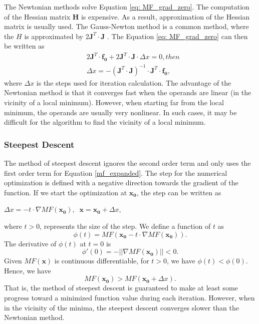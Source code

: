 The Newtonian methods solve Equation \ref{eq: MF_grad_zero}. The computation of the Hessian matrix $\pmb{H}$ is expensive. As a result, approximation of the Hessian matrix is usually used. The Gauss-Newton method is a common method, where the $H$ is approximated by $2\pmb{J}^T \cdot \pmb{J}$ . The Equation \ref{eq: MF_grad_zero} can then be written as 
\begin{equation} \label{eq: gauss-newton}
\begin{split}
&2 \pmb{J}^{T} \cdot \pmb{f_0} + 2\pmb{J}^T \cdot \pmb{J} \cdot \Delta x = 0 ,  then\\
&\Delta x = - (\pmb{J}^T \cdot \pmb{J} )^{-1} \cdot \pmb{J}^{T} \cdot \pmb{f_0},
\end{split}
\end{equation}
where $\Delta x$ is the steps used for iteration calculation. 
The advantage of the Newtonian method is that it converges fast when the operands are linear (in the vicinity of a local minimum). However, when starting far from the local minimum, the operands are usually very nonlinear. In such cases, it may be difficult for the algorithm to find the vicinity of a local minimum. 
\newline

\subsubsection{Steepest Descent}

The method of steepest descent  ignores the second order term and only uses the first order term for  Equation \ref{mf_expanded}. The step for the numerical optimization is defined with a negative direction towards the gradient of the function. If we start the optimization at $\pmb{x_0}$, the step can be written as
\medskip
\newline
\begin{center}
$
\Delta x = - t \cdot \nabla MF(\pmb{x_0}), \;\; \pmb{x} = \pmb{x_0} + \Delta x,
$
\end{center}
\medskip
where $t>0$, represents the size of the step. We define a function of $t$ as 
\begin{equation} \label{eq: function of t}
\phi(t) = MF(\pmb{x_0} - t \cdot \nabla MF(\pmb{x_0})).
\end{equation}The derivative of $\phi(t)$ at $t=0$ is
\begin{equation}\label{t=0}
\phi'(0) = - \vert\vert \nabla MF(\pmb{x_0}) \vert \vert < 0.
\end{equation}Given $MF(\pmb{x})$ is continuous differentiable, for $t>0$, we have $\phi(t) < \phi(0)$. Hence, we have
\begin{equation}
MF(\pmb{x_0}) > MF(\pmb{x_0} + \Delta x).
\end{equation}That is, the method of steepest descent is guaranteed to make at least some progress toward a minimized function value during each iteration. However, when in the vicinity of the minima, the steepest descent converges slower than the Newtonian method.
\newline


